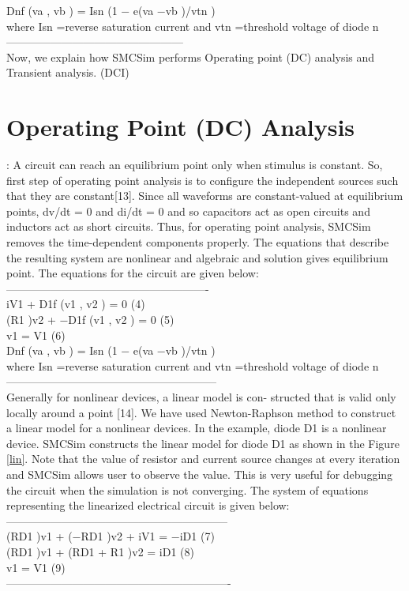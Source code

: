 Dnf (va , vb ) = Isn (1 − e(va −vb )/vtn )\\ 
where Isn =reverse saturation current and vtn =threshold voltage of diode n\\ 
------------------------------------------------\\
Now, we explain how SMCSim performs Operating point (DC) analysis and Transient analysis.
(DCI) 

\section {Operating Point (DC) Analysis}: 
A circuit can reach an equilibrium point only when stimulus is constant. So, first step of operating point analysis is to configure the independent sources such that they are constant[13]. Since all waveforms are constant-valued at equilibrium points, dv/dt = 0 and di/dt = 0 and so capacitors act as open circuits and inductors act as short circuits. Thus, for operating point analysis, SMCSim removes the time-dependent components properly. The equations that describe the resulting system are nonlinear and algebraic and solution gives equilibrium point. The equations for the circuit are given below: \\
-------------------------------------------------------\\

iV1 + D1f (v1 , v2 ) = 0                                    (4) \\
(R1 )v2 + −D1f (v1 , v2 ) = 0                               (5) \\
v1 = V1                                                    (6) \\
Dnf (va , vb ) = Isn (1 − e(va −vb )/vtn ) \\

where Isn =reverse saturation current and vtn =threshold voltage of diode n\\ 
---------------------------------------------------------\\

Generally for nonlinear devices, a linear model is con- structed that is valid only locally around a point [14]. We have used Newton-Raphson method to construct a linear model for a nonlinear devices. In the example, diode D1 is a nonlinear device. SMCSim constructs the linear model for diode D1 as shown in the Figure \ref{lin}. Note that the value of resistor and current source changes at every iteration and SMCSim allows user to observe the value. This is very useful for debugging the circuit when the simulation is not converging. The system of equations representing the linearized electrical circuit is given below:\\ 
------------------------------------------------------------\\
(RD1 )v1 + (−RD1 )v2 + iV1 = −iD1                        (7)\\
(RD1 )v1 + (RD1 + R1 )v2 = iD1                            (8)\\
v1 = V1                                                  (9) \\
-------------------------------------------------------------\\

